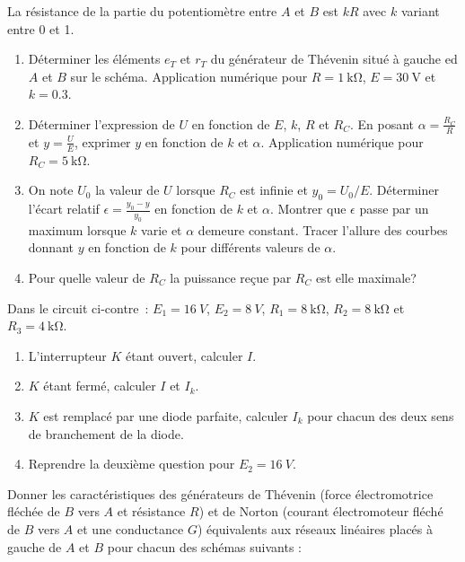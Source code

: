 \begin{exercice}%
La résistance de la partie du potentiomètre entre \(A\) et \(B\) est \(kR\) 
  avec \(k\) variant entre 0 et 1.
  \begin{enumerate}
    \item Déterminer les éléments \(e_T\) et \(r_T\) du générateur de Thévenin 
      situé à gauche ed \(A\) et \(B\) sur le schéma. Application numérique 
      pour \(R=\SI{1}{\kilo\ohm}\), \(E=\SI{30}{\volt}\) et \(k=0.3\).
    \item Déterminer l'expression de \(U\) en fonction de \(E\), \(k\), \(R\) 
      et \(R_C\). En posant \(\alpha = \frac{R_C}{R}\) et \(y= \frac{U}{E}\), 
      exprimer \(y\) en fonction de \(k\) et \(\alpha\). Application numérique 
      pour \(R_C=\SI{5}{\kilo\ohm}\).
    \item On note \(U_0\) la valeur de \(U\) lorsque \(R_C\) est infinie et 
      \(y_0 = U_0/E\). Déterminer l'écart relatif \(\epsilon = 
      \frac{y_0-y}{y_0}\) en fonction de \(k\) et \(\alpha\). Montrer que 
      \(\epsilon\) passe par un maximum lorsque \(k\) varie et \(\alpha\) 
      demeure constant. Tracer l'allure des courbes donnant \(y\) en fonction 
      de \(k\) pour différents valeurs de \(\alpha\).
    \item Pour quelle valeur de \(R_C\) la puissance reçue par \(R_C\) est elle 
      maximale?
  \end{enumerate}
\end{exercice}%

\begin{exercice}%
  Dans le circuit ci-contre~: \(E_1=\SI{16}{V}\), \(E_2 = \SI{8}{V}\), \(R_1 = 
  \SI{8}{\kilo\ohm}\), \(R_2 = \SI{8}{\kilo\ohm}\) et \(R_3 = 
  \SI{4}{\kilo\ohm}\).
  \begin{enumerate}
    \item L'interrupteur \(K\) étant ouvert, calculer \(I\).
    \item \(K\) étant fermé, calculer \(I\) et \(I_k\).
    \item \(K\) est remplacé par une diode parfaite, calculer \(I_k\) pour 
      chacun des deux sens de branchement de la diode.
    \item Reprendre la deuxième question pour \(E_2 = \SI{16}{V}\).
  \end{enumerate}
\end{exercice}%

\begin{exercice}%
  Donner les caractéristiques des générateurs de Thévenin (force électromotrice 
  fléchée de \(B\) vers \(A\) et résistance \(R\)) et de Norton (courant 
  électromoteur fléché de \(B\) vers \(A\) et une conductance \(G\)) 
  équivalents aux réseaux linéaires placés à gauche de \(A\) et \(B\) pour 
  chacun des schémas suivants :
\end{exercice}%
